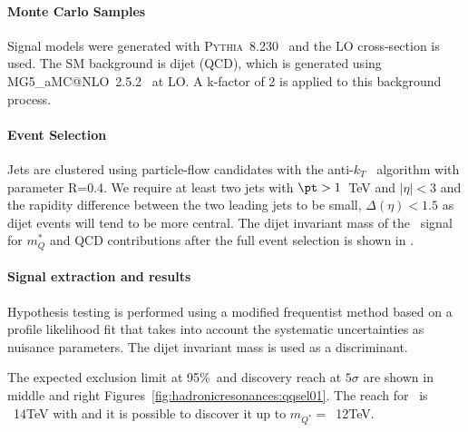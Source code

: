\paragraph*{Monte Carlo Samples}
Signal models were generated with {\scshape Pythia}~8.230~\cite{Sjostrand:2014zea} and the LO cross-section is used. The SM background is dijet (QCD), which is generated using {\scshape MG5\_}a{\scshape MC@NLO}~2.5.2~\cite{Alwall:2014hca} at LO. A k-factor of 2 is applied to this background process.

\paragraph*{Event Selection}

Jets are clustered using particle-flow candidates with the anti-$k_T$~\cite{Cacciari:2008gp} algorithm with parameter R=0.4. We require at least two jets with $\pt >1$~TeV and $|\eta|<3$ and the rapidity difference between the two leading jets to be small, $\Delta(\eta)<1.5$ as dijet events will tend to be more central. The dijet invariant mass of the \qjj\ signal for $m_Q^{*}$ and QCD contributions after the full event selection is shown in .

\paragraph*{Signal extraction and results}
Hypothesis testing is performed using a modified frequentist method based on a profile likelihood fit that takes into account the systematic uncertainties as nuisance parameters. The dijet invariant mass is used as a discriminant.

The expected exclusion limit at 95\%~\cl and discovery reach at $5 \sigma$ are shown in middle and right Figures~\ref{fig:hadronicresonances:qqsel01}. The reach for \qjj\ is ~14TeV with \intlumihelhc and it is possible to discover it up to $m_{Q^{*}}=$~12TeV.

